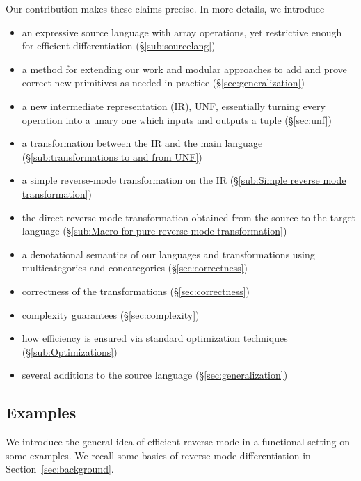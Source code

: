 Our contribution makes these claims precise. In more details, we introduce
\begin{itemize}
    \item an expressive source language with array operations, yet restrictive enough for efficient differentiation (\S\ref{sub:sourcelang})
    \item a method for extending our work and modular approaches to add and prove correct new primitives as needed in practice (\S\ref{sec:generalization})
    \item a new intermediate representation (IR), UNF, essentially turning every operation into a unary one which inputs and outputs a tuple (\S\ref{sec:unf})
    \item a transformation between the IR and the main language (\S\ref{sub:transformations to and from UNF})
    \item a simple reverse-mode transformation on the IR (\S\ref{sub:Simple reverse mode transformation})
    \item the direct reverse-mode transformation obtained from the source to the target language (\S\ref{sub:Macro for pure reverse mode transformation})
    \item a denotational semantics of our languages and transformations using multicategories and concategories (\S\ref{sec:correctness})
    \item correctness of the transformations (\S\ref{sec:correctness})
    \item complexity guarantees (\S\ref{sec:complexity})
    \item how efficiency is ensured via standard optimization techniques (\S\ref{sub:Optimizations})
    \item several additions to the source language (\S\ref{sec:generalization}) 
\end{itemize}

\subsection{Examples}

We introduce the general idea of efficient reverse-mode in a functional setting on some examples.
We recall some basics of reverse-mode differentiation in Section~\ref{sec:background}.

